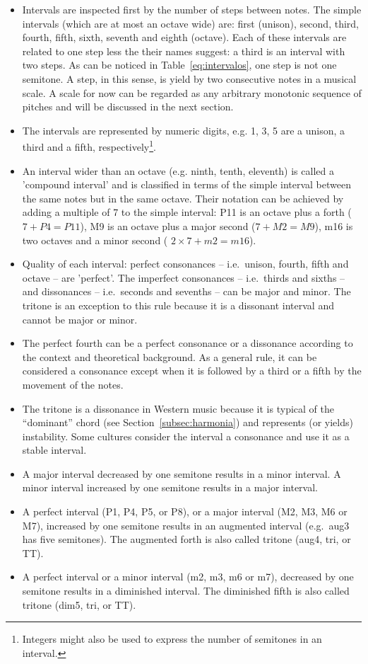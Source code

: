 \documentclass[format=acmsmall, review=false, screen=true]{acmart}
\begin{document}
\begin{itemize}
    \item Intervals are inspected first by the number of steps between notes. The simple intervals (which are at most an octave wide) are: first (unison), second, third, fourth, fifth, sixth, seventh and eighth (octave).
		Each of these intervals are related to one step less the their names suggest: a third is an interval with two steps.
		As can be noticed in Table~\ref{eq:intervalos}, one step is not one semitone.
		A step, in this sense, is yield by two consecutive notes in a musical scale.
		A scale for now can be regarded as any arbitrary monotonic sequence of pitches and will be discussed in the next section.
            \item The intervals are represented by numeric digits, e.g. 1, 3, 5 are a unison, a third and a fifth, respectively\footnote{Integers might also be used to express the number of semitones in an interval.}.
	\item An interval wider than an octave (e.g. ninth, tenth, eleventh) is called a 'compound interval' and is classified in terms of the simple interval between the same notes but in the same octave. Their notation can be achieved by adding a multiple of
                7 to the simple interval: P11 is an octave plus a forth ($7 + P4 = P11$), M9 is an octave plus a major second ($7 + M2 = M9$),
                m16 is two octaves and a minor second ( $2\times 7 + m2 = m16$).
	\item Quality of each interval: perfect consonances --
                i.e.\ unison, fourth, fifth and octave -- are 'perfect'. The imperfect consonances -- i.e.\ thirds and sixths -- and dissonances -- i.e.\ seconds and sevenths -- can be major and minor. The tritone is an exception to this rule because it is a dissonant interval and cannot be major or minor.
	\item The perfect fourth can be a perfect consonance or a dissonance according to the context and theoretical background. As a general rule, it can be considered a consonance except when it is followed by a third or a fifth by the movement of the notes.
	\item The tritone is a dissonance in Western music because
		it is typical of the ``dominant'' chord (see Section~\ref{subsec:harmonia}) and represents (or yields) instability.
                Some cultures consider the interval a consonance and use it as a stable interval.
	\item A major interval decreased by one semitone results in a minor interval. A minor interval increased by one semitone results in a major interval.
	\item A perfect interval (P1, P4, P5, or P8), or a major interval (M2, M3, M6 or M7), increased
by one semitone results in an augmented interval (e.g.\
aug3 has five semitones). The augmented forth
is also called tritone (aug4, tri, or TT).
	\item A perfect interval or a minor interval (m2, m3, m6 or m7), decreased by one semitone results in a diminished interval. The
diminished fifth is also called tritone (dim5, tri, or TT).


\end{itemize}
\end{document}
